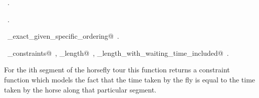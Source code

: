 \documentclass[11.5pt]{report}
\begin{document}
\begin{flushleft}
\begin{list}{}{}
\mbox{}\verb@                                                    horseflyinit)}@\\
\mbox{}\verb@@{\NWsep}
\end{list}
\vspace{-1.5ex}
\footnotesize
\begin{list}{}{\setlength{\itemsep}{-\parsep}\setlength{\itemindent}{-\leftmargin}}
\item \NWtxtMacroDefBy\ .
\item \NWtxtMacroRefIn\ .
\item \NWtxtIdentsDefed\nobreak\  \verb@algo_exact_given_specific_ordering@\nobreak\ .\item \NWtxtIdentsUsed\nobreak\  \verb@generate_constraints@\nobreak\ , \verb@tour_length@\nobreak\ , \verb@tour_length_with_waiting_time_included@\nobreak\ .
\item{}
\end{list}
\vspace{4ex}
\end{flushleft}



\vspace{-0.8cm} \newchunk For the ith segment of the horsefly tour this function returns a constraint function which 
models the fact that the time taken by the fly is equal to the time taken by the horse along that particular segment.
\end{document}
